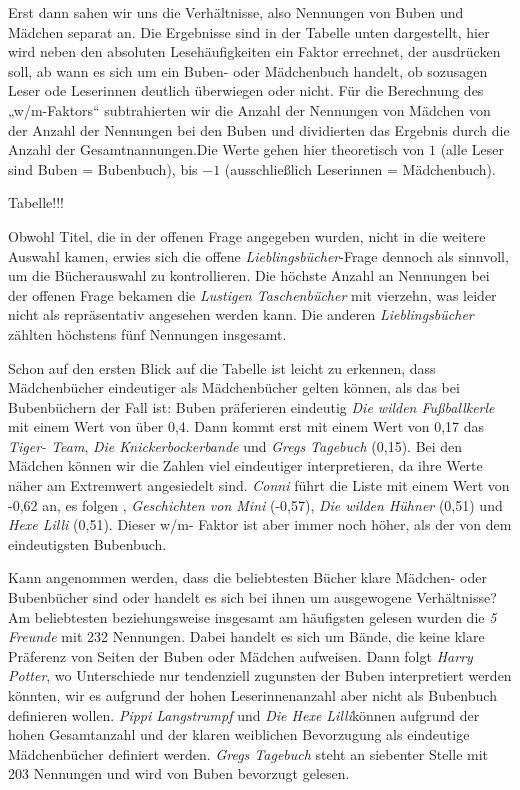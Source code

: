 Erst dann sahen wir uns die Verhältnisse, also Nennungen von Buben und
Mädchen separat an. Die Ergebnisse sind in der Tabelle unten
dargestellt, hier wird neben den absoluten Lesehäufigkeiten ein Faktor
errechnet, der ausdrücken soll, ab wann es sich um ein Buben- oder
Mädchenbuch handelt, ob sozusagen Leser ode Leserinnen deutlich
überwiegen oder nicht. Für die Berechnung des „w/m-Faktors``
subtrahierten wir die Anzahl der Nennungen von Mädchen von der Anzahl
der Nennungen bei den Buben und dividierten das Ergebnis durch die
Anzahl der Gesamtnannungen.Die Werte gehen hier theoretisch von $1$
(alle Leser sind Buben = Bubenbuch), bis $-1$ (ausschließlich Leserinnen
= Mädchenbuch).

Tabelle!!!

Obwohl Titel, die in der offenen Frage angegeben wurden, nicht in die
weitere Auswahl kamen, erwies sich die offene
\emph{Lieblingsbücher}-Frage dennoch als sinnvoll, um die Bücherauswahl
zu kontrollieren. Die höchste Anzahl an Nennungen bei der offenen Frage
bekamen die \emph{Lustigen Taschenbücher} mit vierzehn, was leider nicht
als repräsentativ angesehen werden kann. Die anderen
\emph{Lieblingsbücher} zählten höchstens fünf Nennungen insgesamt.

Schon auf den ersten Blick auf die Tabelle ist leicht zu erkennen, dass
Mädchenbücher eindeutiger als Mädchenbücher gelten können, als das bei
Bubenbüchern der Fall ist: Buben präferieren eindeutig \emph{Die wilden
Fußballkerle} mit einem Wert von über 0,4. Dann kommt erst mit einem
Wert von 0,17 das \emph{Tiger- Team}, \emph{Die Knickerbockerbande} und
\emph{Gregs Tagebuch} (0,15). Bei den Mädchen können wir die Zahlen viel
eindeutiger interpretieren, da ihre Werte näher am Extremwert
angesiedelt sind. \emph{Conni} führt die Liste mit einem Wert von -0,62
an, es folgen , \emph{Geschichten von Mini} (-0,57), \emph{Die wilden
Hühner} (0,51) und \emph{Hexe Lilli} (0,51). Dieser w/m- Faktor ist aber
immer noch höher, als der von dem eindeutigsten Bubenbuch.

Kann angenommen werden, dass die beliebtesten Bücher klare Mädchen- oder
Bubenbücher sind oder handelt es sich bei ihnen um ausgewogene
Verhältnisse? Am beliebtesten beziehungsweise insgesamt am häufigsten
gelesen wurden die \emph{5 Freunde} mit 232 Nennungen. Dabei handelt es
sich um Bände, die keine klare Präferenz von Seiten der Buben oder
Mädchen aufweisen. Dann folgt \emph{Harry Potter}, wo Unterschiede nur
tendenziell zugunsten der Buben interpretiert werden könnten, wir es
aufgrund der hohen Leserinnenanzahl aber nicht als Bubenbuch definieren
wollen. \emph{Pippi Langstrumpf} und \emph{Die Hexe Lilli}können
aufgrund der hohen Gesamtanzahl und der klaren weiblichen Bevorzugung
als eindeutige Mädchenbücher definiert werden. \emph{Gregs Tagebuch}
steht an siebenter Stelle mit 203 Nennungen und wird von Buben bevorzugt
gelesen.

